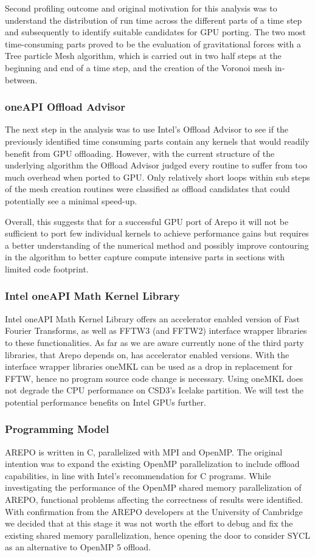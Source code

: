 \documentclass[../main]{subfiles}
\begin{document}
Second profiling outcome and original motivation for this analysis was to understand the distribution of run time across the different parts of a time step and subsequently to identify suitable candidates for GPU porting.
The two most time-consuming parts proved to be the evaluation of gravitational forces with a Tree particle Mesh algorithm, which is carried out in two half steps at the beginning and end of a time step, and the creation of the Voronoi mesh in-between.

\subsubsection{oneAPI Offload Advisor}
The next step in the analysis was to use Intel's Offload Advisor to see if the previously identified time consuming parts contain any kernels that would readily benefit from GPU offloading.
However, with the current structure of the underlying algorithm the Offload Advisor judged every routine to suffer from too much overhead when ported to GPU.
Only relatively short loops within sub steps of the mesh creation routines were classified as offload candidates that could potentially see a minimal speed-up.

Overall, this suggests that for a successful GPU port of Arepo it will not be sufficient to port few individual kernels to achieve performance gains but requires a better understanding of the numerical method and possibly improve contouring in the algorithm to better capture compute intensive parts in sections with limited code footprint.


\subsubsection{Intel oneAPI Math Kernel Library}
Intel oneAPI Math Kernel Library offers an accelerator enabled version of Fast Fourier Transforms, as well as FFTW3 (and FFTW2) interface wrapper libraries to these functionalities.
As far as we are aware currently none of the third party libraries, that Arepo depends on, has accelerator enabled versions.
With the interface wrapper libraries oneMKL can be used as a drop in replacement for FFTW, hence no program source code change is necessary.
Using oneMKL does not degrade the CPU performance on CSD3's Icelake partition.
We will test the potential performance benefits on Intel GPUs further.

\subsubsection{Programming Model}
AREPO is written in C, parallelized with MPI and OpenMP.
The original intention was to expand the existing OpenMP parallelization to include offload capabilities, in line with Intel's recommendation for C programs.
While investigating the performance of the OpenMP shared memory parallelization of AREPO, functional problems affecting the correctness of results were identified.
With confirmation from the AREPO developers at the University of Cambridge we decided that at this stage it was not worth the effort to debug and fix the existing shared memory parallelization, hence opening the door to consider SYCL as an alternative to OpenMP 5 offload.
\end{document}
